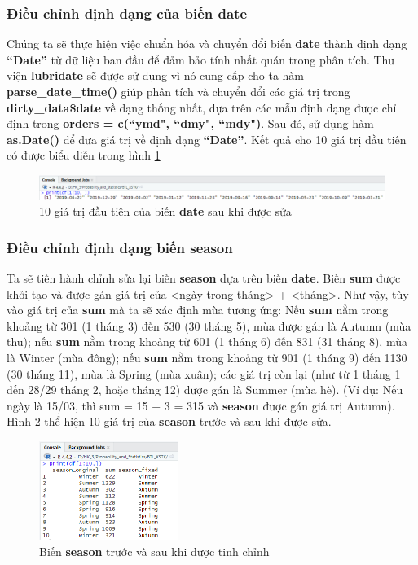 \subsubsection{Điều chỉnh định dạng của biến date}
Chúng ta sẽ thực hiện việc chuẩn hóa và chuyển đổi biến \textbf{date} thành định dạng \textbf{``Date''} từ dữ liệu ban đầu để đảm bảo tính nhất quán trong phân tích. Thư viện \textbf{lubridate} sẽ được sử dụng vì nó cung cấp cho ta hàm \textbf{parse\_date\_time()} giúp phân tích và chuyển đổi các giá trị trong \textbf{dirty\_data\$date} về dạng thống nhất, dựa trên các mẫu định dạng được chỉ định trong \textbf{orders = c(``ymd", ``dmy", ``mdy")}. Sau đó, sử dụng hàm \textbf{as.Date()} để đưa giá trị về định dạng \textbf{``Date''}. Kết quả cho 10 giá trị đầu tiên có được biểu diễn trong hình \ref{f2}
\begin{figure}[!htbp]
    \centering
    \includegraphics[width=\textwidth]{graphics/Pre_processing_data/f2.PNG}
    \caption{10 giá trị đầu tiên của biến \textbf{date} sau khi được sửa}
    \label{f2}
\end{figure} 
\subsubsection{Điều chỉnh định dạng biến season}
Ta sẽ tiến hành chỉnh sửa lại biến \textbf{season} dựa trên biến \textbf{date}. Biến \textbf{sum} được khởi tạo và được gán giá trị của <ngày trong tháng> + <tháng>. Như vậy, tùy vào giá trị của \textbf{sum} mà ta sẽ xác định mùa tương ứng: Nếu \textbf{sum} nằm trong khoảng từ 301 (1 tháng 3) đến 530 (30 tháng 5), mùa được gán là Autumn (mùa thu); nếu \textbf{sum} nằm trong khoảng từ 601 (1 tháng 6) đến 831 (31 tháng 8), mùa là Winter (mùa đông); nếu \textbf{sum} nằm trong khoảng từ 901 (1 tháng 9) đến 1130 (30 tháng 11), mùa là Spring (mùa xuân); các giá trị còn lại (như từ 1 tháng 1 đến 28/29 tháng 2, hoặc tháng 12) được gán là Summer (mùa hè). (Ví dụ: Nếu ngày là 15/03, thì sum = 15 + 3  = 315 và \textbf{season} được gán giá trị Autumn). Hình \ref{f3} thể hiện 10 giá trị của \textbf{season} trước và sau khi được sửa.
\begin{figure}[!htbp]
    \centering
    \includegraphics[width=0.4\textwidth]{graphics/Pre_processing_data/f3.PNG}
    \caption{Biến \textbf{season} trước và sau khi được tinh chỉnh}
    \label{f3}
\end{figure}

